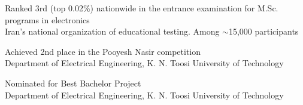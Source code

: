     \begin{onecolentry}
        \begin{highlightsforbulletentries}

            \item Ranked 3rd (top 0.02\%) nationwide in the entrance examination for M.Sc. programs in electronics\\
            {\small Iran's national organization of educational testing. Among $\sim$15,000 participants}

            \item Achieved 2nd place in the Pooyesh Nasir competition\\
            {\small Department of Electrical Engineering, K. N. Toosi University of Technology}

            \item Nominated for Best Bachelor Project\\
            {\small Department of Electrical Engineering, K. N. Toosi University of Technology}

        \end{highlightsforbulletentries}
    \end{onecolentry}
